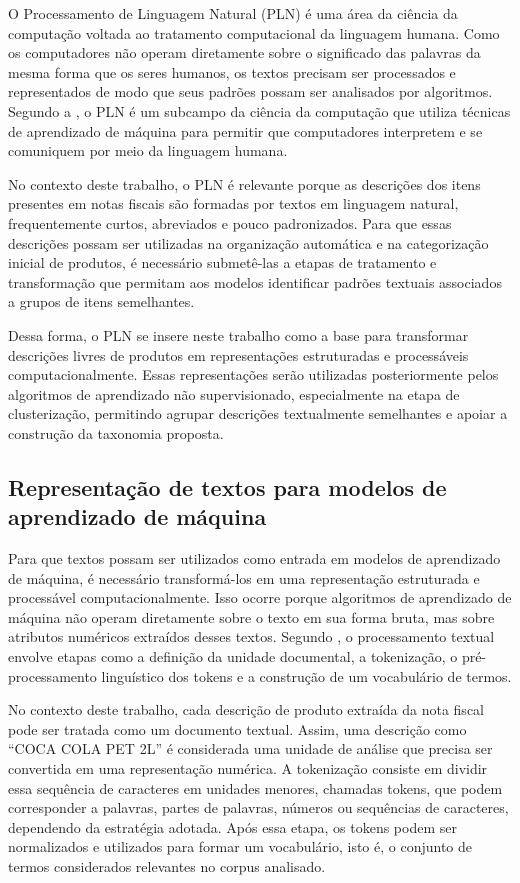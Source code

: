 \documentclass[english,brazilian]{UNISINOSmonografia}
\begin{document}
O Processamento de Linguagem Natural (PLN) é uma área da ciência da computação voltada ao tratamento computacional da linguagem humana. Como os computadores não operam diretamente sobre o significado das palavras da mesma forma que os seres humanos, os textos precisam ser processados e representados de modo que seus padrões possam ser analisados por algoritmos. Segundo a \cite{ibm2024pln}, o PLN é um subcampo da ciência da computação que utiliza técnicas de aprendizado de máquina para permitir que computadores interpretem e se comuniquem por meio da linguagem humana.

No contexto deste trabalho, o PLN é relevante porque as descrições dos itens presentes em notas fiscais são formadas por textos em linguagem natural, frequentemente curtos, abreviados e pouco padronizados. Para que essas descrições possam ser utilizadas na organização automática e na categorização inicial de produtos, é necessário submetê-las a etapas de tratamento e transformação que permitam aos modelos identificar padrões textuais associados a grupos de itens semelhantes.

Dessa forma, o PLN se insere neste trabalho como a base para transformar descrições livres de produtos em representações estruturadas e processáveis computacionalmente. Essas representações serão utilizadas posteriormente pelos algoritmos de aprendizado não supervisionado, especialmente na etapa de clusterização, permitindo agrupar descrições textualmente semelhantes e apoiar a construção da taxonomia proposta.

\subsection{Representação de textos para modelos de aprendizado de máquina}


Para que textos possam ser utilizados como entrada em modelos de aprendizado de máquina, é necessário transformá-los em uma representação estruturada e processável computacionalmente. Isso ocorre porque algoritmos de aprendizado de máquina não operam diretamente sobre o texto em sua forma bruta, mas sobre atributos numéricos extraídos desses textos. Segundo \cite{manning2008informationretrieval}, o processamento textual envolve etapas como a definição da unidade documental, a tokenização, o pré-processamento linguístico dos tokens e a construção de um vocabulário de termos.

No contexto deste trabalho, cada descrição de produto extraída da nota fiscal pode ser tratada como um documento textual. Assim, uma descrição como ``COCA COLA PET 2L'' é considerada uma unidade de análise que precisa ser convertida em uma representação numérica. A tokenização consiste em dividir essa sequência de caracteres em unidades menores, chamadas tokens, que podem corresponder a palavras, partes de palavras, números ou sequências de caracteres, dependendo da estratégia adotada. Após essa etapa, os tokens podem ser normalizados e utilizados para formar um vocabulário, isto é, o conjunto de termos considerados relevantes no corpus analisado.
\end{document}

